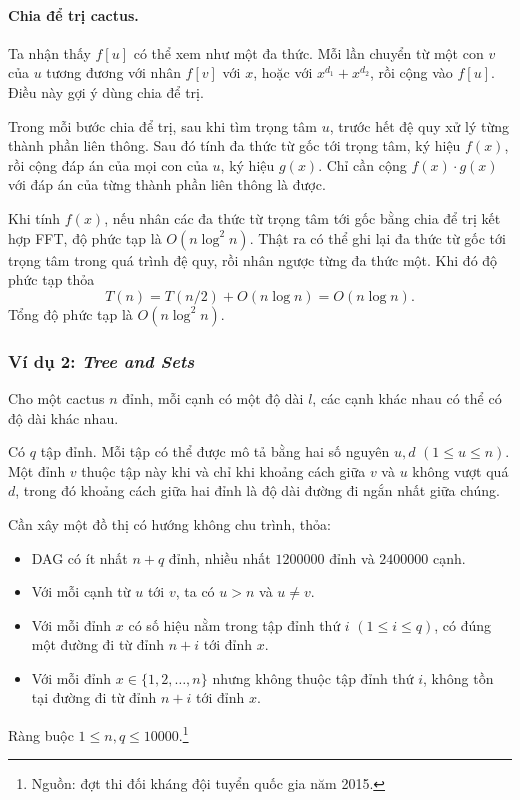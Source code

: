 \documentclass[11pt]{article}
\begin{document}
\paragraph{Chia để trị cactus.}
Ta nhận thấy \(f[u]\) có thể xem như một đa thức. Mỗi lần chuyển từ một con
\(v\) của \(u\) tương đương với nhân \(f[v]\) với \(x\), hoặc với
\(x^{d_1}+x^{d_2}\), rồi cộng vào \(f[u]\). Điều này gợi ý dùng chia để trị.

Trong mỗi bước chia để trị, sau khi tìm trọng tâm \(u\), trước hết đệ quy xử lý
từng thành phần liên thông. Sau đó tính đa thức từ gốc tới trọng tâm, ký hiệu
\(f(x)\), rồi cộng đáp án của mọi con của \(u\), ký hiệu \(g(x)\). Chỉ cần cộng
\(f(x)\cdot g(x)\) với đáp án của từng thành phần liên thông là được.

Khi tính \(f(x)\), nếu nhân các đa thức từ trọng tâm tới gốc bằng chia để trị
kết hợp FFT, độ phức tạp là \(O(n\log^2 n)\). Thật ra có thể ghi lại đa thức
từ gốc tới trọng tâm trong quá trình đệ quy, rồi nhân ngược từng đa thức một.
Khi đó độ phức tạp thỏa
\[
  T(n)=T(n/2)+O(n\log n)=O(n\log n).
\]
Tổng độ phức tạp là \(O(n\log^2 n)\).

\subsubsection{\texorpdfstring{Ví dụ 2: \emph{Tree and Sets}}{Ví dụ 2: Tree and Sets}}

Cho một cactus \(n\) đỉnh, mỗi cạnh có một độ dài \(l\), các cạnh khác nhau có
thể có độ dài khác nhau.

Có \(q\) tập đỉnh. Mỗi tập có thể được mô tả bằng hai số nguyên \(u,d\)
\((1\le u\le n)\). Một đỉnh \(v\) thuộc tập này khi và chỉ khi khoảng cách giữa
\(v\) và \(u\) không vượt quá \(d\), trong đó khoảng cách giữa hai đỉnh là độ
dài đường đi ngắn nhất giữa chúng.

Cần xây một đồ thị có hướng không chu trình, thỏa:
\begin{itemize}
  \item DAG có ít nhất \(n+q\) đỉnh, nhiều nhất \(1200000\) đỉnh và
  \(2400000\) cạnh.
  \item Với mỗi cạnh từ \(u\) tới \(v\), ta có \(u>n\) và \(u\ne v\).
  \item Với mỗi đỉnh \(x\) có số hiệu nằm trong tập đỉnh thứ \(i\)
  \((1\le i\le q)\), có đúng một đường đi từ đỉnh \(n+i\) tới đỉnh \(x\).
  \item Với mỗi đỉnh \(x\in\{1,2,\ldots,n\}\) nhưng không thuộc tập đỉnh thứ
  \(i\), không tồn tại đường đi từ đỉnh \(n+i\) tới đỉnh \(x\).
\end{itemize}
Ràng buộc \(1\le n,q\le 10000\).\footnote{Nguồn: đợt thi đối kháng đội tuyển
quốc gia năm 2015.}
\end{document}

